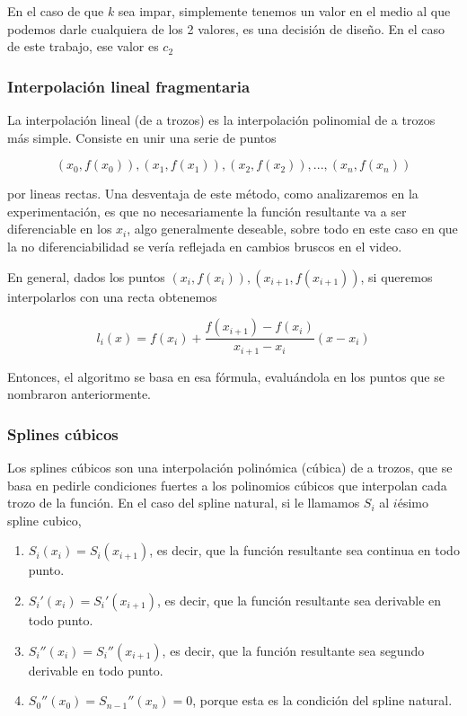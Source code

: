 En el caso de que $k$ sea impar, simplemente tenemos un valor en el medio al que podemos darle cualquiera de los 2 valores, es una decisión de diseño. En el caso de este trabajo, ese valor es $c_2$


\subsubsection{Interpolación lineal fragmentaria}

La interpolación lineal (de a trozos) es la interpolación polinomial de a trozos más simple. Consiste en unir una serie de puntos

\[ (x_0, f(x_0)), (x_1, f(x_1)), (x_2, f(x_2)), ..., (x_n, f(x_n)) \]

por lineas rectas. Una desventaja de este método, como analizaremos en la experimentación, es que no necesariamente la función resultante va a ser diferenciable en los $x_i$, algo generalmente deseable, sobre todo en este caso en que la no diferenciabilidad se vería reflejada en cambios bruscos en el video.

En general, dados los puntos $(x_i, f(x_i)), (x_{i+1}, f(x_{i+1}))$, si queremos interpolarlos con una recta obtenemos

\[ l_i(x) = f(x_i) + \frac{f(x_{i+1}) - f(x_i)}{x_{i+1} - x_i} (x - x_i) \]

Entonces, el algoritmo se basa en esa fórmula, evaluándola en los puntos que se nombraron anteriormente.

\subsubsection{Splines cúbicos}

Los splines cúbicos son una interpolación polinómica (cúbica) de a trozos, que se basa en pedirle condiciones fuertes a los polinomios cúbicos que interpolan cada trozo de la función. En el caso del spline natural, si le llamamos $S_i$ al $i$ésimo spline cubico,

\begin{enumerate}
    \item $S_i(x_i) = S_i(x_{i+1})$, es decir, que la función resultante sea continua en todo punto.
    \item $S_i'(x_i) = S_i'(x_{i+1})$, es decir, que la función resultante sea derivable en todo punto.
    \item $S_i''(x_i) = S_i''(x_{i+1})$, es decir, que la función resultante sea segundo derivable en todo punto.
    \item $S_0''(x_0) = S_{n-1}''(x_n) = 0$, porque esta es la condición del spline natural.
\end{enumerate}

